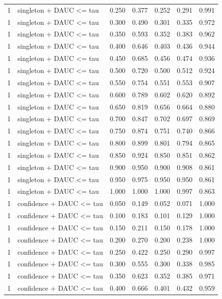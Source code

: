 \begin{tabular}{rlrrrrr}
1 & singleton + DAUC <= tau & 0.250 & 0.377 & 0.252 & 0.291 & 0.991 \\
1 & singleton + DAUC <= tau & 0.300 & 0.490 & 0.301 & 0.335 & 0.972 \\
1 & singleton + DAUC <= tau & 0.350 & 0.593 & 0.352 & 0.383 & 0.962 \\
1 & singleton + DAUC <= tau & 0.400 & 0.646 & 0.403 & 0.436 & 0.944 \\
1 & singleton + DAUC <= tau & 0.450 & 0.685 & 0.456 & 0.474 & 0.936 \\
1 & singleton + DAUC <= tau & 0.500 & 0.720 & 0.500 & 0.512 & 0.924 \\
1 & singleton + DAUC <= tau & 0.550 & 0.754 & 0.551 & 0.553 & 0.907 \\
1 & singleton + DAUC <= tau & 0.600 & 0.789 & 0.602 & 0.620 & 0.892 \\
1 & singleton + DAUC <= tau & 0.650 & 0.819 & 0.656 & 0.664 & 0.880 \\
1 & singleton + DAUC <= tau & 0.700 & 0.847 & 0.702 & 0.697 & 0.869 \\
1 & singleton + DAUC <= tau & 0.750 & 0.874 & 0.751 & 0.740 & 0.866 \\
1 & singleton + DAUC <= tau & 0.800 & 0.899 & 0.801 & 0.794 & 0.865 \\
1 & singleton + DAUC <= tau & 0.850 & 0.924 & 0.850 & 0.851 & 0.862 \\
1 & singleton + DAUC <= tau & 0.900 & 0.950 & 0.900 & 0.908 & 0.861 \\
1 & singleton + DAUC <= tau & 0.950 & 0.975 & 0.950 & 0.950 & 0.861 \\
1 & singleton + DAUC <= tau & 1.000 & 1.000 & 1.000 & 0.997 & 0.863 \\
1 & confidence + DAUC <= tau & 0.050 & 0.149 & 0.052 & 0.071 & 1.000 \\
1 & confidence + DAUC <= tau & 0.100 & 0.183 & 0.101 & 0.129 & 1.000 \\
1 & confidence + DAUC <= tau & 0.150 & 0.211 & 0.150 & 0.178 & 1.000 \\
1 & confidence + DAUC <= tau & 0.200 & 0.270 & 0.200 & 0.238 & 1.000 \\
1 & confidence + DAUC <= tau & 0.250 & 0.422 & 0.250 & 0.290 & 0.997 \\
1 & confidence + DAUC <= tau & 0.300 & 0.555 & 0.300 & 0.338 & 0.985 \\
1 & confidence + DAUC <= tau & 0.350 & 0.623 & 0.352 & 0.385 & 0.971 \\
1 & confidence + DAUC <= tau & 0.400 & 0.666 & 0.401 & 0.432 & 0.959 \\

\end{tabular}
